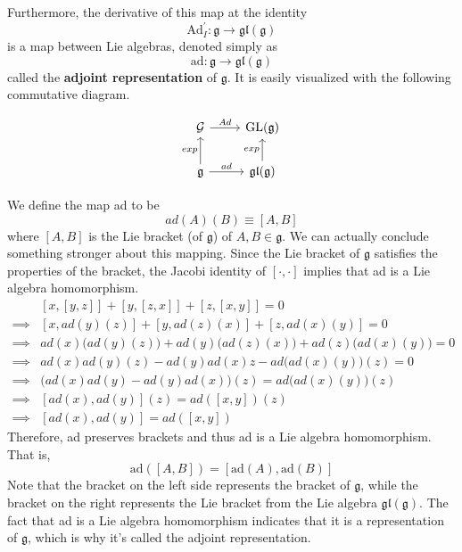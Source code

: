 \documentclass{article}
\DeclareMathOperator{\GL}{GL}
\begin{document}
    \begin{definition}
      Furthermore, the derivative of this map at the identity 
      \begin{equation}
        \text{Ad}_I^\prime: \mathfrak{g} \longrightarrow \mathfrak{gl}(\mathfrak{g})
      \end{equation}
      is a map between Lie algebras, denoted simply as 
      \begin{equation}
        \text{ad}: \mathfrak{g} \longrightarrow \mathfrak{gl}(\mathfrak{g})
      \end{equation}
      called the \textbf{adjoint representation} of $\mathfrak{g}$. It is easily visualized with the following commutative diagram. 

      \[\begin{tikzcd}
      \mathcal{G} \arrow{r}{Ad} & \GL(\mathfrak{g}) \\
      \mathfrak{g} \arrow{u}{exp} \arrow{r}{ad} & \mathfrak{gl}(\mathfrak{g}) \arrow{u}{exp}
      \end{tikzcd}\]

      We define the map ad to be 
      \begin{equation}
        ad(A)(B) \equiv [A,B]
      \end{equation}
      where $[A,B]$ is the Lie bracket (of $\mathfrak{g}$) of $A, B \in \mathfrak{g}$. We can actually conclude something stronger about this mapping. Since the Lie bracket of $\mathfrak{g}$ satisfies the properties of the bracket, the Jacobi identity of $[\cdot, \cdot]$ implies that ad is a Lie algebra homomorphism. 
      \begin{align*}
        & [x, [y,z]] + [y,[z,x]] + [z, [x,y]] = 0 \\
        \implies & [x, ad(y)(z)] + [y, ad(z)(x)] + [z, ad(x)(y)] = 0 \\
        \implies & ad(x)\big(ad(y)(z)\big) + ad(y) \big( ad(z)(x)\big) + ad(z) \big(ad(x)(y)\big) = 0 \\
        \implies & ad(x) ad(y) (z) - ad(y) ad(x) z - ad \big(ad(x)(y)\big) (z) = 0 \\
        \implies & \big( ad(x) ad(y) - ad(y) ad(x) \big) (z) = ad\big( ad(x)(y) \big) (z) \\
        \implies & [ad(x), ad(y)] (z) = ad ([x,y]) (z) \\
        \implies & [ad(x), ad(y)] = ad([x,y])
      \end{align*}
      Therefore, ad preserves brackets and thus ad is a Lie algebra homomorphism. That is, 
      \begin{equation}
        \text{ad}([A,B]) = [\text{ad}(A), \text{ad}(B)]
      \end{equation}
      Note that the bracket on the left side represents the bracket of $\mathfrak{g}$, while the bracket on the right represents the Lie bracket from the Lie algebra $\mathfrak{gl}(\mathfrak{g})$. The fact that ad is a Lie algebra homomorphism indicates that it is a representation of $\mathfrak{g}$, which is why it's called the adjoint representation. 
    \end{definition}
\end{document}
